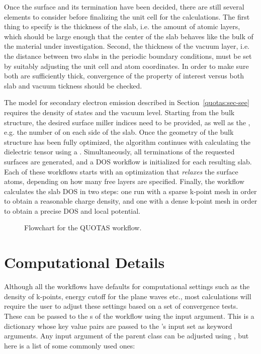 \begin{refsection}
Once the surface and its termination have been decided, there are still several elements to consider before finalizing the unit cell for the calculations. The first thing to specify is the thickness of the slab, i.e. the amount of atomic layers, which should be large enough that the center of the slab behaves like the bulk of the material under investigation. Second, the thickness of the vacuum layer, i.e. the distance between two slabs in the periodic boundary conditions, must be set by suitably adjusting the unit cell and atom coordinates. In order to make sure both are sufficiently thick, convergence of the property of interest versus both slab and vacuum tickness should be checked.

The model for secondary electron emission described in Section~\ref{quotas:sec-see} requires the density of states and the vacuum level. Starting from the bulk structure, the desired surface miller indices need to be provided, as well as the , e.g. the number of  on each side of the slab. Once the geometry of the bulk structure has been fully optimized, the algorithm continues with calculating the dielectric tensor using a . Simultaneously, all terminations of the requested surfaces are generated, and a DOS workflow is initialized for each resulting slab. Each of these workflows starts with an optimization that \textit{relaxes} the surface atoms, depending on how many free layers are specified. Finally, the workflow calculates the slab DOS in two steps: one run with a sparse k-point mesh in order to obtain a reasonable charge density, and one with a dense k-point mesh in order to obtain a precise DOS and local potential.

\begin{figure}[ht]

\caption{\label{automation:fig-quotas} Flowchart for the QUOTAS workflow.}
\end{figure}

\section{\label{automation:sec-computational}Computational Details}

Although all the workflows have defaults for computational settings such as the density of k-points, energy cutoff for the plane waves etc., most calculations will require the user to adjust these settings based on a set of convergence tests. These can be passed to the s of the workflow using the  input argument. This is a dictionary whose key value pairs are passed to the 's input set as keyword arguments. Any input argument of the parent  class can be adjusted using , but here is a list of some commonly used ones:


\end{refsection}
